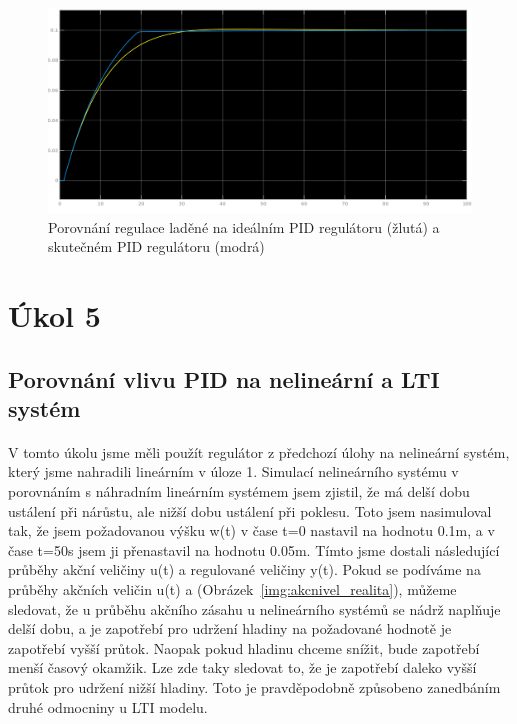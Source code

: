 \documentclass{article}
\begin{document}
	\begin{figure}[H]
 	\includegraphics[width=\textwidth]{ukol4comp}
 	\caption{Porovnání regulace laděné na ideálním PID regulátoru (žlutá) a skutečném PID regulátoru (modrá)}
 	\end{figure}
   			

	\section{Úkol 5}
	\subsection{Porovnání vlivu PID na nelineární a LTI systém}
	\paragraph{}	
	V tomto úkolu jsme měli použít regulátor z předchozí úlohy na nelineární systém, který jsme nahradili lineárním v úloze 1.  Simulací nelineárního systému v porovnáním s náhradním lineárním systémem jsem zjistil, že má delší dobu ustálení při nárůstu, ale nižší dobu ustálení při poklesu. Toto jsem nasimuloval tak, že jsem požadovanou výšku w(t) v čase t=0 nastavil na hodnotu 0.1m, a v čase t=50s jsem ji přenastavil na hodnotu 0.05m. Tímto jsme dostali následující průběhy akční veličiny u(t) a regulované veličiny y(t). Pokud se podíváme na průběhy akčních veličin u(t) a (Obrázek~\ref{img:akcnivel_realita}), můžeme sledovat, že u průběhu akčního zásahu u nelineárního systémů se nádrž naplňuje delší dobu, a je zapotřebí pro udržení hladiny na požadované hodnotě je zapotřebí vyšší průtok. Naopak pokud hladinu chceme snížit, bude zapotřebí menší časový okamžik. Lze zde taky sledovat to, že je zapotřebí daleko vyšší průtok pro udržení nižší hladiny. Toto je pravděpodobně způsobeno zanedbáním druhé odmocniny u LTI modelu.
	
\end{document}
